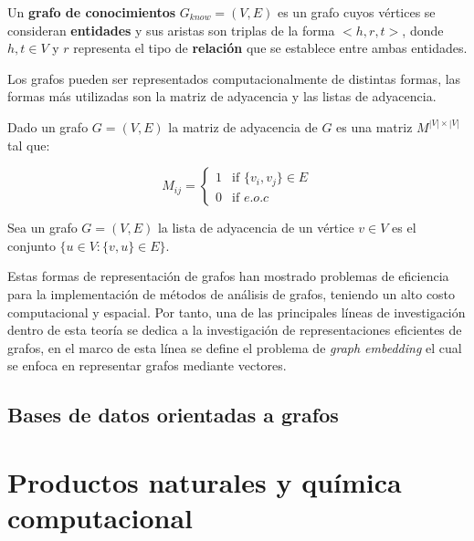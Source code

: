 \begin{definition}
    Un \textbf{grafo de conocimientos} $G_{know} = (V,E)$ es un grafo cuyos v\'ertices
    se consideran \textbf{entidades} y sus aristas son triplas de la forma $<h,r,t>$,
    donde $h, t \in V$ y $r$ representa el tipo de \textbf{relaci\'on} que se establece entre
    ambas entidades. 
\end{definition}



Los grafos pueden ser representados computacionalmente de distintas formas, las formas
m\'as utilizadas son la matriz de adyacencia y las listas de adyacencia.


\begin{definition}
    Dado un grafo $G = (V,E)$ la matriz de adyacencia de $G$ es una matriz
    $M^{|V|\times|V|}$ tal que:
    
    $$
            M_{ij} =
        \left\{
            \begin{array}{ll}
                1  & \mbox{if } \{v_i, v_j\} \in E \\
                0 & \mbox{if } e.o.c
            \end{array}
        \right.
    $$

\end{definition}


\begin{definition}
    Sea un grafo $G = (V,E)$ la lista de adyacencia de un v\'ertice $v \in V$ es el conjunto
    $\{ u \in V : \{v,u\} \in E \}$.
\end{definition}

Estas formas de representaci\'on de grafos han mostrado problemas de eficiencia
para la implementaci\'on de m\'etodos de an\'alisis de grafos, teniendo un
alto costo computacional y espacial. Por tanto, una de las principales l\'ineas de
investigaci\'on dentro de esta teor\'ia se dedica a la investigaci\'on de representaciones eficientes de grafos,
en el marco de esta l\'inea se define el problema de \textit{graph embedding} el cual se enfoca en representar
grafos mediante vectores.

\subsection{Bases de datos orientadas a grafos}


\section{Productos naturales y química computacional}

